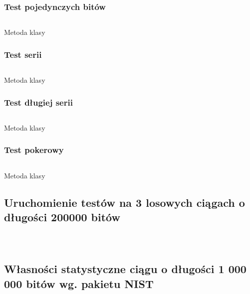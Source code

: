 \documentclass[12pt]{article}
\begin{document}
\subsubsection{Test pojedynczych bitów}

\begin{listing}[H]
	\inputminted[firstline=34,lastline=37]{python}{../fips.py}
	\caption{Metoda klasy}
\end{listing}

\subsubsection{Test serii}

\begin{listing}[H]
	\inputminted[firstline=39,lastline=56]{python}{../fips.py}
	\caption{Metoda klasy}
\end{listing}

\subsubsection{Test długiej serii}

\begin{listing}[H]
	\inputminted[firstline=58,lastline=65]{python}{../fips.py}
	\caption{Metoda klasy}
\end{listing}

\subsubsection{Test pokerowy}

\begin{listing}[H]
	\inputminted[firstline=67,lastline=79]{python}{../fips.py}
	\caption{Metoda klasy}
\end{listing}

\subsection{Uruchomienie testów na 3 losowych ciągach o długości 200000 bitów}

\inputminted{text}{1-test-1.txt}
\inputminted{text}{1-test-2.txt}
\inputminted{text}{1-test-3.txt}

\subsection{Własności statystyczne ciągu o długości 1 000 000 bitów wg. pakietu NIST}

\inputminted[fontsize=\footnotesize]{text}{1-1mil-nist.txt}
\end{document}
